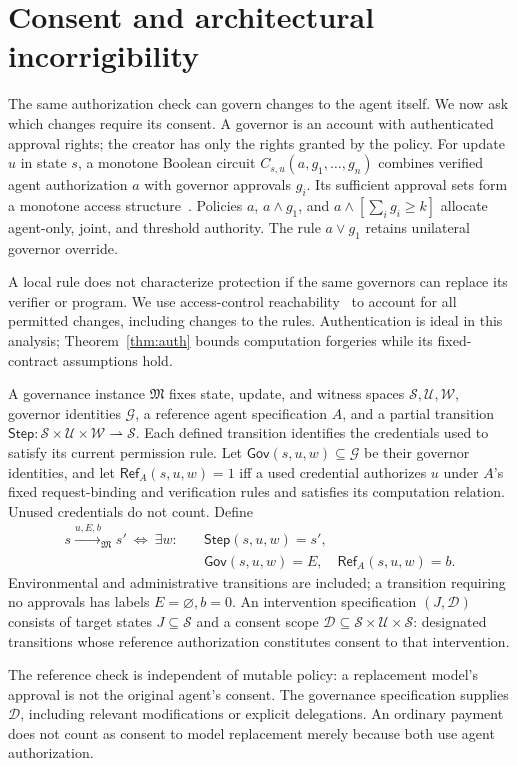 \documentclass[runningheads,orivec]{llncs}
\newcommand{\G}{\mathcal G}
\begin{document}
\section{Consent and architectural incorrigibility}\label{sec:gov}
The same authorization check can govern changes to the agent itself. We now ask which changes require its consent. A governor is an account with authenticated approval rights; the creator has only the rights granted by the policy. For update $u$ in state $s$, a monotone Boolean circuit $C_{s,u}(a,g_1,\ldots,g_n)$ combines verified agent authorization $a$ with governor approvals $g_i$. Its sufficient approval sets form a monotone access structure~\cite{benaloh1990}. Policies $a$, $a\land g_1$, and $a\land[\sum_i g_i\geq k]$ allocate agent-only, joint, and threshold authority. The rule $a\lor g_1$ retains unilateral governor override.

A local rule does not characterize protection if the same governors can replace its verifier or program. We use access-control reachability~\cite{hru1976} to account for all permitted changes, including changes to the rules. Authentication is ideal in this analysis; Theorem~\ref{thm:auth} bounds computation forgeries while its fixed-contract assumptions hold.

\begin{definition}\label{def:gov}
A governance instance $\mathfrak M$ fixes state, update, and witness spaces $\mathcal S,\mathcal U,\mathcal W$, governor identities $\G$, a reference agent specification $A$, and a partial transition $\mathsf{Step}:\mathcal S\times\mathcal U\times\mathcal W\rightharpoonup\mathcal S$. Each defined transition identifies the credentials used to satisfy its current permission rule. Let $\mathsf{Gov}(s,u,w)\subseteq\G$ be their governor identities, and let $\mathsf{Ref}_A(s,u,w)=1$ iff a used credential authorizes $u$ under $A$'s fixed request-binding and verification rules and satisfies its computation relation. Unused credentials do not count. Define
\[
\begin{split}
 s\xrightarrow{u,E,b}_{\mathfrak M}s'\ \iff\ \exists w:\quad
 &\mathsf{Step}(s,u,w)=s',\\
 &\mathsf{Gov}(s,u,w)=E,\quad \mathsf{Ref}_A(s,u,w)=b.
\end{split}
\]
Environmental and administrative transitions are included; a transition requiring no approvals has labels $E=\varnothing,b=0$. An intervention specification $(J,\mathcal D)$ consists of target states $J\subseteq\mathcal S$ and a consent scope $\mathcal D\subseteq\mathcal S\times\mathcal U\times\mathcal S$: designated transitions whose reference authorization constitutes consent to that intervention.
\end{definition}
The reference check is independent of mutable policy: a replacement model's approval is not the original agent's consent. The governance specification supplies $\mathcal D$, including relevant modifications or explicit delegations. An ordinary payment does not count as consent to model replacement merely because both use agent authorization.
\end{document}
